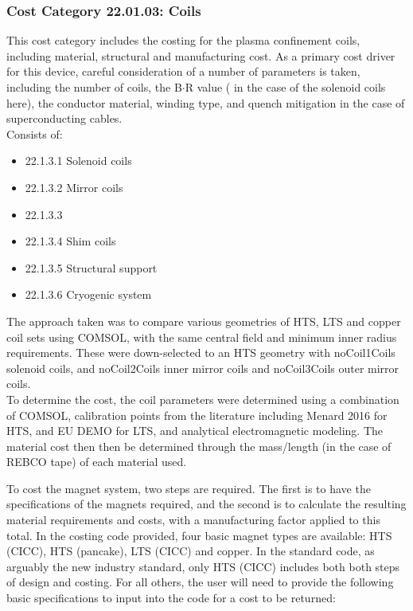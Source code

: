 \subsubsection*{Cost Category 22.01.03: Coils}

This cost category includes the costing for the plasma confinement coils, including  material, structural and manufacturing cost. As a primary cost driver for this device, careful consideration of a number of parameters is taken, including the number of coils, the B$\cdot$R value ( in the case of the solenoid coils here), the conductor material, winding type, and quench mitigation in the case of superconducting cables.\\

Consists of:

\begin{itemize}
    \item 22.1.3.1 Solenoid coils
    \item 22.1.3.2 Mirror coils
    \item 22.1.3.3
    \item 22.1.3.4 Shim coils
    \item 22.1.3.5 Structural support
    \item 22.1.3.6 Cryogenic system
\end{itemize}
   

The approach taken was to compare various geometries of HTS, LTS and copper coil sets using COMSOL, with the same central field and minimum inner radius requirements. These were down-selected to an HTS geometry with noCoil1Coils solenoid coils, and noCoil2Coils inner mirror coils and noCoil3Coils outer mirror coils.\\

To determine the cost, the coil parameters were determined using a combination of COMSOL, calibration points from the literature including Menard 2016 \cite{Menard2016} for HTS, and EU DEMO for LTS, and analytical electromagnetic modeling. The material cost then then be determined through the mass/length (in the case of REBCO tape) of each material used. 

To cost the magnet system, two steps are required. The first is to have the specifications of the magnets required, and the second is to calculate the resulting material requirements and costs, with a manufacturing factor applied to this total. In the costing code provided, four basic magnet types are available: HTS (CICC), HTS (pancake), LTS (CICC) and copper. In the standard code, as arguably the new industry standard, only HTS (CICC) includes both both steps of design and costing. For all others, the user will need to provide the following basic specifications to input into the code for a cost to be returned:

